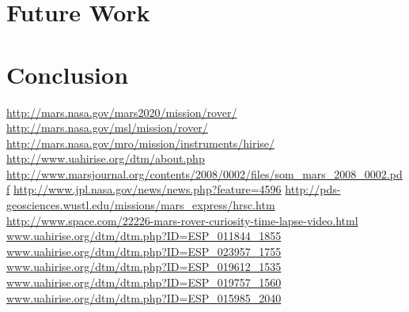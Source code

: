 \documentclass[12pt]{article}
\begin{document}

\section{Future Work}
\label{sec:future_work}


\section{Conclusion}
\label{sec:conclusion}

\pagebreak
\begin{thebibliography}{30}
  \url{http://mars.nasa.gov/mars2020/mission/rover/}
  \url{http://mars.nasa.gov/msl/mission/rover/}
  \url{http://mars.nasa.gov/mro/mission/instruments/hirise/}
  \url{http://www.uahirise.org/dtm/about.php}
  \url{http://www.marsjournal.org/contents/2008/0002/files/som_mars_2008_0002.pdf}
  \url{http://www.jpl.nasa.gov/news/news.php?feature=4596}
  \url{http://pds-geosciences.wustl.edu/missions/mars_express/hrsc.htm}
  \url{http://www.space.com/22226-mars-rover-curiosity-time-lapse-video.html}
  \url{www.uahirise.org/dtm/dtm.php?ID=ESP_011844_1855}
  \url{www.uahirise.org/dtm/dtm.php?ID=ESP_023957_1755}
  \url{www.uahirise.org/dtm/dtm.php?ID=ESP_019612_1535}
  \url{www.uahirise.org/dtm/dtm.php?ID=ESP_019757_1560}
  \url{www.uahirise.org/dtm/dtm.php?ID=ESP_015985_2040}
\end{thebibliography}
\end{document}
